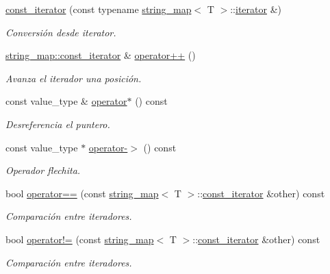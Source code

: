 \begin{DoxyCompactItemize}
\item 
\hyperlink{classstring__map_1_1const__iterator_a615c996037b07d56db8de0f7775b1a57}{const\-\_\-iterator} (const typename \hyperlink{classstring__map}{string\-\_\-map}$<$ T $>$\-::\hyperlink{classstring__map_1_1iterator}{iterator} \&)
\begin{DoxyCompactList}\small\item\em Conversión desde iterator. \end{DoxyCompactList}\item 
\hyperlink{classstring__map_1_1const__iterator}{string\-\_\-map\-::const\-\_\-iterator} \& \hyperlink{classstring__map_1_1const__iterator_aba282a526ddb0685bd1433998484181e}{operator++} ()
\begin{DoxyCompactList}\small\item\em Avanza el iterador una posición. \end{DoxyCompactList}\item 
const value\-\_\-type \& \hyperlink{classstring__map_1_1const__iterator_a0efad597b0ffe1a1db9fe46be5802ef5}{operator$\ast$} () const 
\begin{DoxyCompactList}\small\item\em Desreferencia el puntero. \end{DoxyCompactList}\item 
const value\-\_\-type $\ast$ \hyperlink{classstring__map_1_1const__iterator_aa892ecb777d31558fca1933613d6ea9d}{operator-\/$>$} () const 
\begin{DoxyCompactList}\small\item\em Operador flechita. \end{DoxyCompactList}\item 
bool \hyperlink{classstring__map_1_1const__iterator_adca0fb340d1da380d7eb2ace2dd4f1d0}{operator==} (const \hyperlink{classstring__map}{string\-\_\-map}$<$ T $>$\-::\hyperlink{classstring__map_1_1const__iterator}{const\-\_\-iterator} \&other) const 
\begin{DoxyCompactList}\small\item\em Comparación entre iteradores. \end{DoxyCompactList}\item 
bool \hyperlink{classstring__map_1_1const__iterator_a80a030933f7794456a8cb6e79db96d23}{operator!=} (const \hyperlink{classstring__map}{string\-\_\-map}$<$ T $>$\-::\hyperlink{classstring__map_1_1const__iterator}{const\-\_\-iterator} \&other) const 
\begin{DoxyCompactList}\small\item\em Comparación entre iteradores. \end{DoxyCompactList}\end{DoxyCompactItemize}
